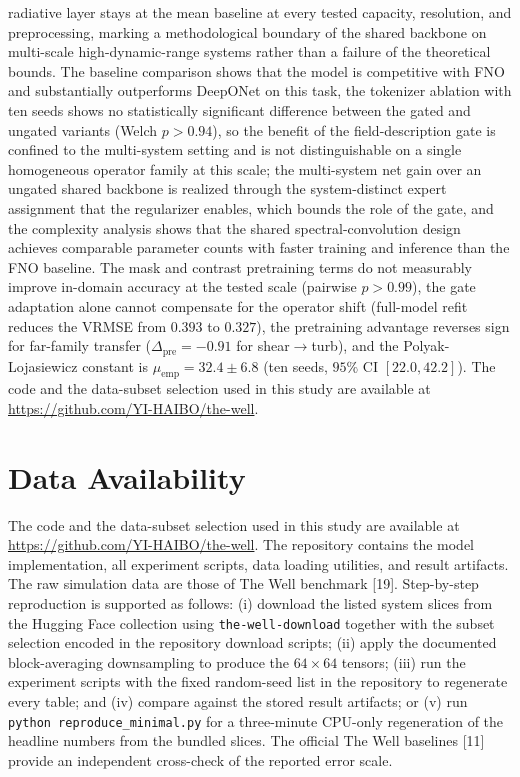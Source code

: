 \documentclass[preprint,12pt]{elsarticle}
\begin{document}
radiative layer stays at the mean baseline at every tested capacity, resolution, and preprocessing, marking a methodological boundary of the shared backbone on multi-scale high-dynamic-range systems rather than a failure of the theoretical bounds. The baseline comparison shows that the model is competitive with FNO and substantially outperforms DeepONet on this task, the tokenizer ablation with ten seeds shows no statistically significant difference between the gated and ungated variants (Welch $p>0.94$), so the benefit of the field-description gate is confined to the multi-system setting and is not distinguishable on a single homogeneous operator family at this scale; the multi-system net gain over an ungated shared backbone is realized through the system-distinct expert assignment that the regularizer enables, which bounds the role of the gate, and the complexity analysis shows that the shared spectral-convolution design achieves comparable parameter counts with faster training and inference than the FNO baseline. The mask and contrast pretraining terms do not measurably improve in-domain accuracy at the tested scale (pairwise $p>0.99$), the gate adaptation alone cannot compensate for the operator shift (full-model refit reduces the VRMSE from $0.393$ to $0.327$), the pretraining advantage reverses sign for far-family transfer ($\Delta_{\mathrm{pre}}=-0.91$ for shear$\to$turb), and the Polyak-Lojasiewicz constant is $\mu_{\mathrm{emp}}=32.4\pm6.8$ (ten seeds, $95\%$ CI $[22.0,42.2]$). The code and the data-subset selection used in this study are available at \url{https://github.com/YI-HAIBO/the-well}.

\section*{Data Availability}
The code and the data-subset selection used in this study are available at \url{https://github.com/YI-HAIBO/the-well}.
The repository contains the model implementation, all experiment scripts, data loading utilities,
and result artifacts. The raw simulation data are those of The Well benchmark [19]. Step-by-step
reproduction is supported as follows: (i) download the listed system slices from the Hugging Face
collection using \texttt{the-well-download} together with the subset selection encoded in the repository download scripts; (ii) apply
the documented block-averaging downsampling to produce the $64\times64$ tensors; (iii) run the
experiment scripts with the fixed random-seed list in the repository to regenerate every table;
and (iv) compare against the stored result artifacts; or (v) run \texttt{python reproduce\_minimal.py} for a three-minute CPU-only regeneration of the headline numbers from the bundled slices. The official The Well baselines [11] provide
an independent cross-check of the reported error scale.
\end{document}
